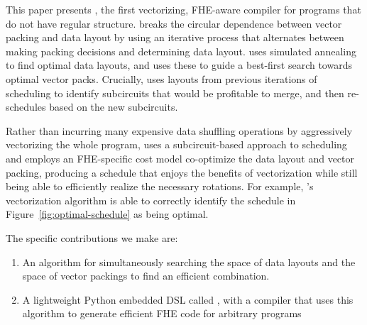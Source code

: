 This paper presents \system, the first vectorizing, FHE-aware compiler for programs that do not have regular structure. \system breaks the circular dependence between vector packing and data layout by using an iterative process that alternates between making packing decisions and determining data layout. \system uses simulated annealing to find optimal data layouts, and uses these to guide a best-first search towards optimal vector packs. Crucially, \system uses layouts from previous iterations of scheduling to identify subcircuits that would be profitable to merge, and then re-schedules based on the new subcircuits.


Rather than incurring many expensive data shuffling operations by aggressively vectorizing the whole program, \system uses a subcircuit-based approach to scheduling and employs an FHE-specific cost model co-optimize the data layout and vector packing, producing a schedule that enjoys the benefits of vectorization while still being able to efficiently realize the necessary rotations. For example, \system's vectorization algorithm is able to correctly identify the schedule in Figure~\ref{fig:optimal-schedule} as being optimal.


The specific contributions we make are:
\begin{enumerate}
    \item An algorithm for simultaneously searching the space of data layouts and the space of vector packings to find an efficient combination. %
    \item A lightweight Python embedded DSL called \system, with a compiler that uses this algorithm to generate efficient FHE code for arbitrary programs
\end{enumerate}

